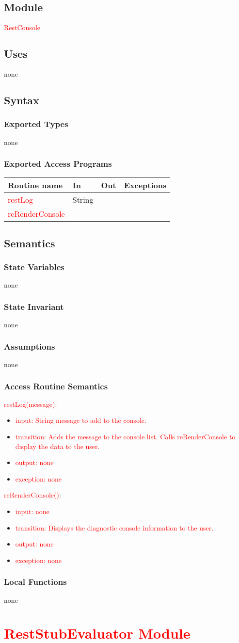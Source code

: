 \documentclass[12pt, titlepage]{article}
\newcommand{\newModule}[9]{
	\subsection* {Module}
		#1
	\subsection* {Uses}
		#2
	\subsection* {Syntax}
		\subsubsection* {Exported Types}
			#3
		\subsubsection* {Exported Access Programs}
			#4
	\subsection* {Semantics}
		\subsubsection* {State Variables}
			#5
		\subsubsection* {State Invariant}
			#6
		\subsubsection* {Assumptions}
			#7
		\subsubsection* {Access Routine Semantics}
			#8
		\subsubsection* {Local Functions}
			#9
}
\newcommand{\revAccessProgram}[5]{
	\noindent \textcolor{red}{#1}:
		\begin{itemize}
		    \item \textcolor{red}{input: #2}
			\item \textcolor{red}{transition: #3}
			\item \textcolor{red}{output: #4}
			\item \textcolor{red}{exception: #5}
		\end{itemize}
}
\newcommand{\row}[4]{#1 & #2 & #3 & #4 ~\\ \hline}
\newcommand{\accessProgramsTableStart}{
\begin{tabular}{| l | l | l | l |}
\hline
\textbf{Routine name} & \textbf{In} & \textbf{Out} & \textbf{Exceptions}\\
\hline
}
\newcommand{\accessProgramsTableEnd}{
	\end{tabular}
}
\begin{document}
\label{RestConsole}

\newModule{\textcolor{red}{RestConsole}}
	{%
		none
	}
	{%
		none
	}
	{%
		\accessProgramsTableStart
			\row{\textcolor{red}{restLog}}{String}{}{}
			\row{\textcolor{red}{reRenderConsole}}{}{}{}
		\accessProgramsTableEnd
	}
	{%
		none \\
	}
	{%
        none
	}
	{%
		none
	}
	{%
		\revAccessProgram{restLog(message)}
			{%
				String message to add to the console.
			}
			{%
				Adds the message to the console list. 
				Calls reRenderConsole to display the data to the user.
			}
			{%
				none
			}
			{%
				none
			}
		\revAccessProgram{reRenderConsole()}
			{%
				none
			}
			{%
				Displays the diagnostic console information to the user.
			}
			{%
				none
			}
			{%
				none
			}
	}
	{%
		none
	}
	
\newpage

\section {\textcolor{red}{RestStubEvaluator Module}}
\end{document}
